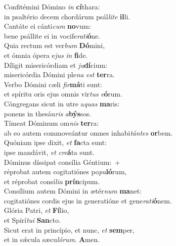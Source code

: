 \evenverse Confitémini Dómino \textit{in} \textbf{cí}thara:~\*\\
\evenverse in psaltério decem chordárum psál\textit{li}\textit{te} \textbf{il}li.\\
\oddverse Cantáte ei cánti\textit{cum} \textbf{no}vum:~\*\\
\oddverse bene psállite ei in vocife\textit{ra}\textit{ti}\textbf{ó}ne.\\
\evenverse Quia rectum est ver\textit{bum} \textbf{Dó}mini,~\*\\
\evenverse et ómnia ópera e\textit{jus} \textit{in} \textbf{fi}de.\\
\oddverse Díligit misericórdiam et \textit{ju}\textbf{dí}cium:~\*\\
\oddverse misericórdia Dómini ple\textit{na} \textit{est} \textbf{ter}ra.\\
\evenverse Verbo Dómini cæli \textit{fir}\textbf{má}ti sunt:~\*\\
\evenverse et spíritu oris ejus omnis vir\textit{tus} \textit{e}\textbf{ó}rum.\\
\oddverse Cóngregans sicut in utre a\textit{quas} \textbf{ma}ris:~\*\\
\oddverse ponens in thesáu\textit{ris} \textit{a}\textbf{býs}sos.\\
\evenverse Tímeat Dóminum om\textit{nis} \textbf{ter}ra:~\*\\
\evenverse ab eo autem commoveántur omnes inhabi\textit{tán}\textit{tes} \textbf{or}bem.\\
\oddverse Quóniam ipse dixit, \textit{et} \textbf{fa}cta sunt:~\*\\
\oddverse ipse mandávit, \textit{et} \textit{cre}\textbf{á}ta sunt.\\
\evenverse Dóminus díssipat consília Géntium:~+\\
\evenverse  réprobat autem cogitatiónes po\textit{pu}\textbf{ló}rum,~\*\\
\evenverse et réprobat consí\textit{li}\textit{a} \textbf{prín}cipum.\\
\oddverse Consílium autem Dómini in ætér\textit{num} \textbf{ma}net:~\*\\
\oddverse cogitatiónes cordis ejus in generatióne et gene\textit{ra}\textit{ti}\textbf{ó}nem.\\
\evenverse Glória Patri, \textit{et} \textbf{Fí}lio,~\*\\
\evenverse et Spirí\textit{tu}\textit{i} \textbf{San}cto.\\
\oddverse Sicut erat in princípio, et nunc, \textit{et} \textbf{sem}per,~\*\\
\oddverse et in sǽcula sæcu\textit{ló}\textit{rum}. \textbf{A}men.\\
